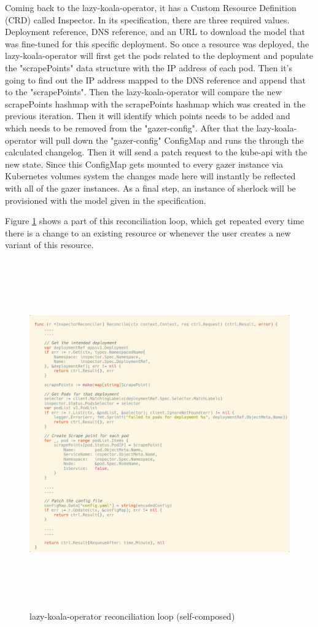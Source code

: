 Coming back to the \ac{lazy-koala-operator}, it has a Custom Resource Definition (CRD) called Inspector. In its specification, there are three required values. Deployment reference, DNS reference, and an URL to download the model that was fine-tuned for this specific deployment. So once a resource was deployed, the \ac{lazy-koala-operator} will first get the pods related to the deployment and populate the "scrapePoints" data structure with the IP address of each pod. Then it's going to find out the IP address mapped to the DNS reference and append that to the "scrapePoints". Then the \ac{lazy-koala-operator} will compare the new scrapePoints hashmap with the scrapePoints hashmap which was created in the previous iteration. Then it will identify which points needs to be added and which needs to be removed from the "gazer-config". After that the \ac{lazy-koala-operator} will pull down the "gazer-config" ConfigMap and runs the through the calculated changelog. Then it will send a patch request to the kube-api with the new state. Since this ConfigMap gets mounted to every \ac{gazer} instance via Kubernetes volumes system the changes made here will instantly be reflected with all of the \ac{gazer} instances. As a final step, an instance of \ac{sherlock} will be provisioned with the model given in the specification.

Figure \ref{fig:reconcile-loop} shows a part of this reconciliation loop, which get repeated every time there is a change to an existing resource or whenever the user creates a new variant of this resource.

\begin{figure}[H]
    \includegraphics[height=15cm]{assets/implementation/reconcile-loop.png}
    \caption{\ac{lazy-koala-operator} reconciliation loop (self-composed)}
    \label{fig:reconcile-loop}
\end{figure}



